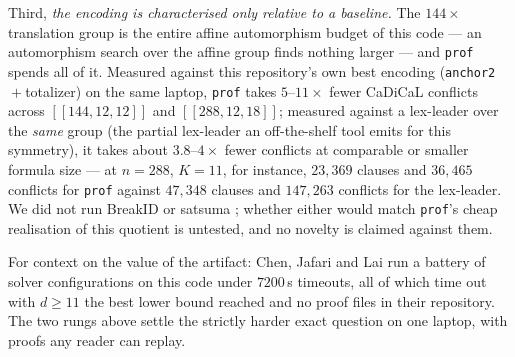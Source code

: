 \documentclass[11pt]{amsart}
\newcommand{\gross}{[[144,12,12]]}
\theoremstyle{plain}
\theoremstyle{definition}
\theoremstyle{remark}
\begin{document}
Third, \emph{the encoding is characterised only relative to a baseline.} The
$144\times$ translation group is the entire affine automorphism budget of this
code --- an automorphism search over the affine group finds nothing larger ---
and \texttt{prof} spends all of it. Measured against this repository's own best
encoding (\texttt{anchor2}${}+{}$totalizer) on the same laptop, \texttt{prof}
takes $5$--$11\times$ fewer CaDiCaL conflicts across $\gross$ and
$[[288,12,18]]$; measured against a lex-leader over the \emph{same} group (the
partial lex-leader an off-the-shelf tool emits for this symmetry), it takes
about $3.8$--$4\times$ fewer conflicts at comparable or smaller formula size ---
at $n=288$, $K=11$, for instance, $23{,}369$ clauses and $36{,}465$ conflicts for
\texttt{prof} against $47{,}348$ clauses and $147{,}263$ conflicts for the
lex-leader. We did not run BreakID \cite{BreakID} or satsuma \cite{satsuma};
whether either would match \texttt{prof}'s cheap realisation of this quotient is
untested, and no novelty is claimed against them.

For context on the value of the artifact: Chen, Jafari and Lai
\cite{ChenJafariLai} run a battery of solver configurations on this code under
$7200$\,s timeouts, all of which time out with $d\ge11$ the best lower bound
reached and no proof files in their repository. The two rungs above settle the
strictly harder exact question on one laptop, with proofs any reader can replay.
\end{document}
